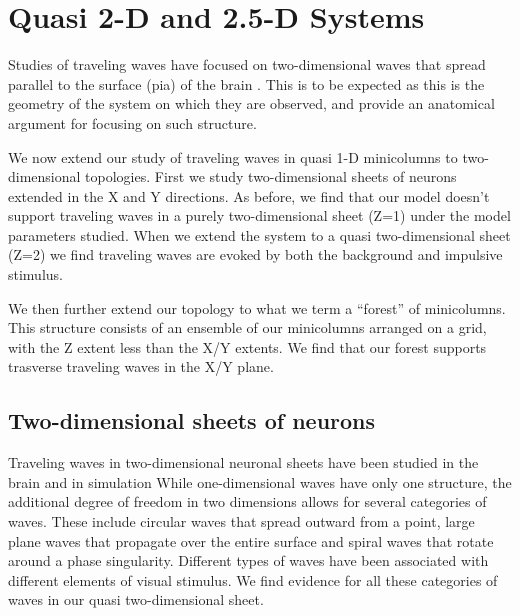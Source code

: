 
\chapter{Quasi 2-D and 2.5-D Systems}
Studies of traveling waves have focused on two-dimensional waves that spread parallel to the surface (pia) of the brain \citep{reimer2010}\citep{keane2015}\citep{Townsend2018}\citep{Golomb1997}\citep{Qi2015}. 
This is to be expected as this is the geometry of the system on which they are observed, and \citep{Wilson1973} provide an anatomical argument for focusing on such structure. 

We now extend our study of traveling waves in quasi 1-D minicolumns to two-dimensional topologies.
First we study two-dimensional sheets of neurons extended in the X and Y directions.
As before, we find that our model doesn't support traveling waves in a purely two-dimensional sheet (Z=1) under the model parameters studied.
When we extend the system to a quasi two-dimensional sheet (Z=2) we find traveling waves are evoked by both the background and impulsive stimulus.

We then further extend our topology to what we term a ``forest'' of minicolumns.
This structure consists of an ensemble of our minicolumns arranged on a grid, with the Z extent less than the X/Y extents.
We find that our forest supports trasverse traveling waves in the X/Y plane.

\section{Two-dimensional sheets of neurons}
Traveling waves in two-dimensional neuronal sheets have been studied in the brain \citep{huang2004}\citep{Townsend2018} and in simulation\citep{keane2015}\citep{Spreizer2019}
While one-dimensional waves have only one structure, the additional degree of freedom in two dimensions allows for several categories of waves.
These include circular waves that spread outward from a point, large plane waves that propagate over the entire surface and spiral waves\citep{Huang2010}\citep{Gu2013} that rotate around a phase singularity.
Different types of waves have been associated with different elements of visual stimulus\citep{Benucci2007}.
We find evidence for all these categories of waves in our quasi two-dimensional sheet.

